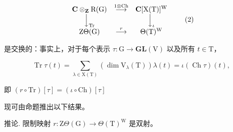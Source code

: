 \[
\begin{array}{c c c} \mathbf {C} \otimes_ {\mathbf {Z}} \mathrm{R(G)} & \stackrel {{1 \otimes \mathrm{Ch}}} {{\longrightarrow}} & \mathbf {C} [ \mathrm{X(T)} ] ^ {\mathrm{W}} \\ \Big \downarrow_ {\mathrm{Tr}} & & \Big \downarrow_ {\iota} \\ \mathrm{Z} \Theta (\mathrm{G}) & \stackrel {{r}} {{\longrightarrow}} & \Theta (\mathrm{T}) ^ {\mathrm{W}} \end{array}\tag{2}
\]

是交换的：事实上，对于每个表示 \(\tau : \mathrm{G} \to \mathbf{GL}(\mathrm{V})\) 以及所有 \(t \in \mathrm{T}\)，

\[
\operatorname{Tr} \tau (t) = \sum_ {\lambda \in \mathrm{X} (\mathrm{T})} \left(\dim \mathrm{V} _ {\lambda} (\mathrm{T})\right) \lambda (t) = \iota (\operatorname{Ch} \tau) (t),
\]

即 \((r\circ \mathrm{Tr})[\tau ] = (\iota \circ \mathrm{Ch})[\tau ]\)

现可由命题推出以下结果。

推论. 限制映射 \(r: \mathrm{Z}\Theta(\mathrm{G}) \to \Theta(\mathrm{T})^{\mathrm{W}}\) 是双射。

